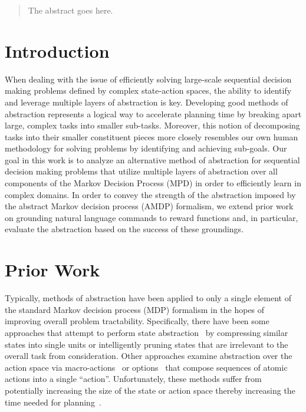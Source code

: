 \documentclass[conference]{IEEEtran}
\begin{document}
\begin{abstract}
The abstract goes here.
\end{abstract}

\IEEEpeerreviewmaketitle

\section{Introduction}
When dealing with the issue of efficiently solving large-scale sequential decision making problems defined by complex state-action spaces, the ability to identify and leverage multiple layers of abstraction is key. Developing good methods of abstraction represents a logical way to accelerate planning time by breaking apart large, complex tasks into smaller sub-tasks. Moreover, this notion of decomposing tasks into their smaller constituent pieces more closely resembles our own human methodology for solving problems by identifying and achieving sub-goals. Our goal in this work is to analyze an alternative method of abstraction for sequential decision making problems that utilize multiple layers of abstraction over all components of the Markov Decision Process (MPD) in order to efficiently learn in complex domains. In order to convey the strength of the abstraction imposed by the abstract Markov decision process (AMDP) formalism, we extend prior work on grounding natural language commands to reward functions and, in particular, evaluate the abstraction based on the success of these groundings.

\section{Prior Work}
Typically, methods of abstraction have been applied to only a single element of the standard Markov decision process (MDP) formalism in the hopes of improving overall problem tractability. Specifically, there have been some approaches that attempt to perform state abstraction~\cite{Li2006TowardsAU} by compressing similar states into single units or intelligently pruning states that are irrelevant to the overall task from consideration. Other approaches examine abstraction over the action space via macro-actions~\cite{Hauskrecht1998HierarchicalSO} or options~\cite{Sutton1999BetweenMA} that compose sequences of atomic actions into a single ``action''. Unfortunately, these methods suffer from potentially increasing the size of the state or action space thereby increasing the time needed for planning~\cite{Jong2008TheUO}.
\end{document}
